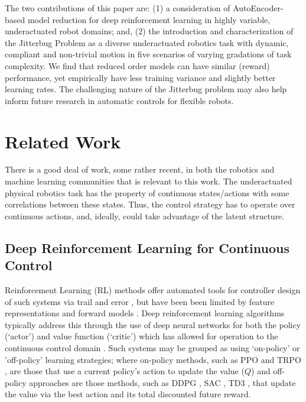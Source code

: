 \documentclass{article}
\begin{document}
The two contributions of this paper are: (1) a consideration of AutoEncoder-based model reduction for deep reinforcement learning in highly variable, underactuated robot domains; and, (2) the introduction and characterization of the Jitterbug Problem as a diverse underactuated robotics task with dynamic, compliant and non-trivial motion in five scenarios of varying gradations of task complexity.
We find that reduced order models can have similar (reward) performance, yet empirically have less training variance and slightly better learning rates.  
The challenging nature of the Jitterbug problem may also help inform future research in automatic controls for flexible robots.

\section{Related Work}

There is a good deal of work, some rather recent, in both the robotics and machine learning communities that is relevant to this work.
The underactuated physical robotics task has the property of continuous states/actions with some correlations between these states.
Thus, the control strategy has to operate over continuous actions, and, ideally, could take advantage of the latent structure. 

\subsection{Deep Reinforcement Learning for Continuous Control}

Reinforcement Learning (RL) methods offer automated tools for controller design of such systems via trail and error \cite{sutton1998reinforcement}, but have been been limited by feature representations and forward models \cite{duan2016benchmarking}. 
Deep reinforcement learning algorithms typically address this through the use of deep neural networks for both the policy (`actor') and value function (`critic') which has allowed for operation to the continuous control domain \cite{mnih2015human,DDPG}. 
Such systems may be grouped as using `on-policy' or 'off-policy' learning strategies; where on-policy methods, such as PPO \cite{PPO} and TRPO \cite{TRPO}, are those that use a current policy's action to update the value ($Q$) and off-policy approaches are those methods, such as DDPG \cite{DDPG}, SAC \cite{SAC}, TD3 \cite{TD3}, that update the value via the best action and its total discounted future reward.  
\end{document}
